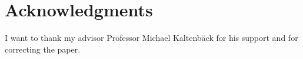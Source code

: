 \section{Acknowledgments}
I want to thank my advisor Professor Michael Kaltenbäck for his support and for correcting the paper. 
